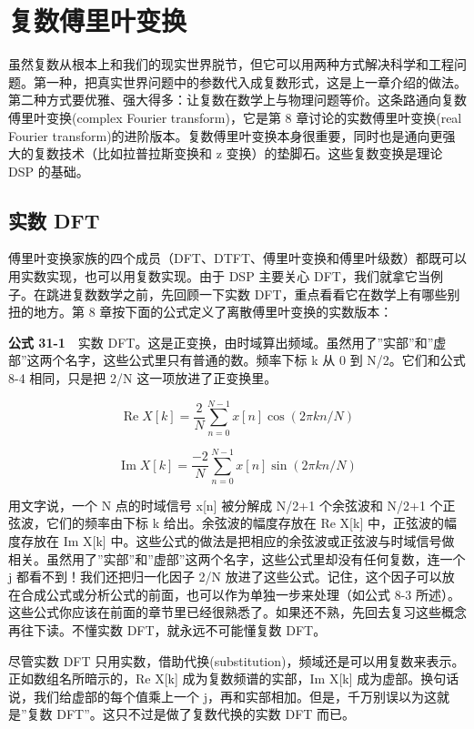
\chapter{复数傅里叶变换}\label{ch-31}

虽然复数从根本上和我们的现实世界脱节，但它可以用两种方式解决科学和工程问题。第一种，把真实世界问题中的参数代入成复数形式，这是上一章介绍的做法。第二种方式要优雅、强大得多：让复数在数学上与物理问题等价。这条路通向复数傅里叶变换(complex
Fourier transform)，它是第 8 章讨论的实数傅里叶变换(real Fourier
transform)的进阶版本。复数傅里叶变换本身很重要，同时也是通向更强大的复数技术（比如拉普拉斯变换和
z 变换）的垫脚石。这些复数变换是理论 DSP 的基础。

\section{实数 DFT}

傅里叶变换家族的四个成员（DFT、DTFT、傅里叶变换和傅里叶级数）都既可以用实数实现，也可以用复数实现。由于
DSP 主要关心 DFT，我们就拿它当例子。在跳进复数数学之前，先回顾一下实数
DFT，重点看看它在数学上有哪些别扭的地方。第 8
章按下面的公式定义了离散傅里叶变换的实数版本：

\textbf{公式 31-1}　实数
DFT。这是正变换，由时域算出频域。虽然用了''实部''和''虚部''这两个名字，这些公式里只有普通的数。频率下标
k 从 0 到 N/2。它们和公式 8-4 相同，只是把 2/N 这一项放进了正变换里。

\[\operatorname{Re}X[k] = \frac{2}{N}\sum_{n=0}^{N-1} x[n]\cos(2\pi kn/N)\]

\[\operatorname{Im}X[k] = \frac{-2}{N}\sum_{n=0}^{N-1} x[n]\sin(2\pi kn/N)\]

用文字说，一个 N 点的时域信号 x{[}n{]} 被分解成 N/2+1 个余弦波和 N/2+1
个正弦波，它们的频率由下标 k 给出。余弦波的幅度存放在 Re X{[}k{]}
中，正弦波的幅度存放在 Im X{[}k{]}
中。这些公式的做法是把相应的余弦波或正弦波与时域信号做相关。虽然用了''实部''和''虚部''这两个名字，这些公式里却没有任何复数，连一个
j 都看不到！我们还把归一化因子 2/N
放进了这些公式。记住，这个因子可以放在合成公式或分析公式的前面，也可以作为单独一步来处理（如公式
8-3
所述）。这些公式你应该在前面的章节里已经很熟悉了。如果还不熟，先回去复习这些概念再往下读。不懂实数
DFT，就永远不可能懂复数 DFT。

尽管实数 DFT
只用实数，借助代换(substitution)，频域还是可以用复数来表示。正如数组名所暗示的，Re
X{[}k{]} 成为复数频谱的实部，Im X{[}k{]}
成为虚部。换句话说，我们给虚部的每个值乘上一个
j，再和实部相加。但是，千万别误以为这就是''复数
DFT''。这只不过是做了复数代换的实数 DFT 而已。

